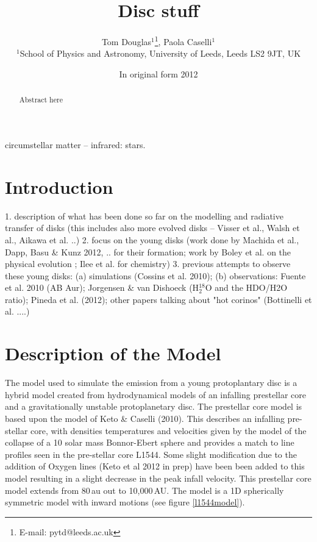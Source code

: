 \documentclass[useAMS,usenatbib]{mn2e}
\title[Disc stuff]{Disc stuff}
\author[Tom  Douglas, Paola Caselli, Et al.]{Tom Douglas$^{1}$\thanks{E-mail:
pytd@leeds.ac.uk}, Paola Caselli$^{1}$\\
$^{1}$School of Physics and Astronomy, University of Leeds, Leeds LS2 9JT, UK}
\begin{document}
\date{In original form 2012}

\pagerange{\pageref{firstpage}--\pageref{lastpage}} 

\maketitle

\label{firstpage}

\begin{abstract}
Abstract here
\end{abstract}

\begin{keywords}
circumstellar matter -- infrared: stars.
\end{keywords}

\section{Introduction}

1. description of what has been done so far on the modelling and radiative transfer of disks (this includes also more evolved disks -- Visser et al., Walsh et al., Aikawa et al. ..)
2. focus on the young disks (work done by Machida et al., Dapp, Basu \& Kunz 2012, .. for their formation; work by Boley et al. on the physical evolution ; Ilee et al. for chemistry) 
3. previous attempts to observe these young disks: (a) simulations (Cossins et al. 2010); (b) observations: Fuente et al. 2010 (AB Aur); Jorgensen \& van Dishoeck (H$_2^{18}$O and the HDO/H2O ratio); Pineda et al. (2012); other papers talking about "hot corinos" (Bottinelli et al. ....)

\section{Description of the Model}

The model used to simulate the emission from a young protoplantary disc is a hybrid model created from hydrodynamical models of an infalling prestellar core and a gravitationally unstable protoplanetary disc. The prestellar core model is based upon the model of Keto \& Caselli (2010). This describes an infalling pre-stellar core, with densities temperatures and velocities given by the model of the collapse of a 10 solar mass Bonnor-Ebert sphere and provides a match to line profiles seen in the pre-stellar core L1544. Some slight modification due to the addition of Oxygen lines (Keto et al 2012 in prep) have been been added to this model resulting in a slight decrease in the peak infall velocity. This prestellar core model extends from 80$\,$au out to 10,000$\,$AU. The model is a 1D spherically symmetric model with inward motions (see figure \ref{l1544model}).
\end{document}
